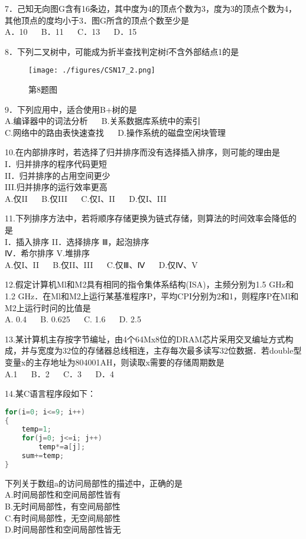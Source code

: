 7．己知无向图G含有16条边，其中度为4的顶点个数为3，度为3的顶点个数为4，其他顶点的度均小于3．图G所含的顶点个数至少是 \\
A．10  $\quad$  B．11  $\quad$  C．13  $\quad$  D．15

8．下列二叉树中，可能成为折半查找判定树f不含外部结点1的是 \\
\begin{figure}[ht]
\centering
\texttt{[image: ./figures/CSN17\_2.png]}
\caption{第8题图} \label{CSN17_fig2}
\end{figure}

9．下列应用中，适合使用B+树的是 \\
A.编译器中的词法分析 $\quad$ B.关系数据库系统中的索引 \\
C.网络中的路由表快速查找  $\quad$  D.操作系统的磁盘空闲块管理

10.在内部排序时，若选择了归并排序而没有选择插入排序，则可能的理由是 \\
I．归并排序的程序代码更短 \\
II．归并排序的占用空间更少 \\
III.归并排序的运行效率更高 \\
A.仅II  $\quad$  B.仅III  $\quad$  C.仅I、II  $\quad$  D.仅I、III

11.下列排序方法中，若将顺序存储更换为链式存储，则算法的时间效率会降低的是 \\
I．插入排序    II．选择排序  Ⅲ，起泡排序 \\
Ⅳ．希尔排序    V.堆排序 \\
A.仅I、II $\quad$ B.仅II、III  $\quad$  C.仅Ⅲ、Ⅳ  $\quad$  D.仅Ⅳ、V

12.假定计算机Ml和M2具有相同的指令集体系结构(ISA)，主频分别为1.5 GHz和1.2 GHz．在Ml和M2上运行某基准程序P，平均CPI分别为2和1，则程序P在Ml和M2上运行时问的比值是 \\
A. 0.4  $\quad$  B. 0.625  $\quad$  C. 1.6  $\quad$  D. 2.5

13.某计算机主存按字节编址，由4个64Mx8位的DRAM芯片采用交叉编址方式构成，并与宽度为32位的存储器总线相连，主存每次最多读写32位数据．若double型变量x的主存地址为804001AH，则读取x需要的存储周期数是 \\
A.1  $\quad$  B．2  $\quad$  C．3  $\quad$  D．4

14.某C语言程序段如下： \\
\begin{lstlisting}[language=cpp]
for(i=0; i<=9; i++)
{
    temp=1;
    for(j=0; j<=i; j++)
        temp*=a[j];
    sum+=temp;
}
\end{lstlisting}
下列关于数组a的访问局部性的描述中，正确的是 \\
A.时间局部性和空间局部性皆有 \\
B.无时间局部性，有空间局部性 \\
C.有时间局部性，无空间局部性 \\
D.时间局部性和空间局部性皆无